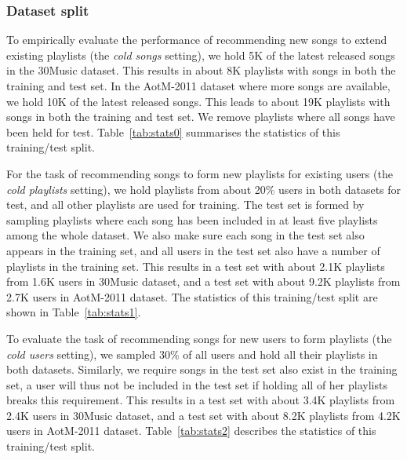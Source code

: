 \subsubsection{Dataset split}
To empirically evaluate the performance of recommending new songs to extend existing playlists (\ie the \emph{cold songs} setting),
we hold 5K of the latest released songs in the 30Music dataset. 
This results in about 8K playlists with songs in both the training and test set.
In the AotM-2011 dataset where more songs are available, we hold 10K of the latest released songs.
This leads to about 19K playlists with songs in both the training and test set.
We remove playlists where all songs have been held for test. %
Table~\ref{tab:stats0} summarises the statistics of this training/test split.

For the task of recommending songs to form new playlists for existing users (\ie the \emph{cold playlists} setting),
we hold playlists from about 20\% users in both datasets for test, and all other playlists are used for training.
The test set is formed by sampling playlists where each song has been included in at least five playlists among the whole dataset.
We also make sure each song in the test set also appears in the training set,
and all users in the test set also have a number of playlists in the training set.
This results in a test set with about 2.1K playlists from 1.6K users in 30Music dataset,
and a test set with about 9.2K playlists from 2.7K users in AotM-2011 dataset.
The statistics of this training/test split are shown in Table~\ref{tab:stats1}.

To evaluate the task of recommending songs for new users to form playlists (\ie the \emph{cold users} setting),
we sampled 30\% of all users and hold all their playlists in both datasets.
Similarly, we require songs in the test set also exist in the training set,
a user will thus not be included in the test set if holding all of her playlists breaks this requirement.
This results in a test set with about 3.4K playlists from 2.4K users in 30Music dataset,
and a test set with about 8.2K playlists from 4.2K users in AotM-2011 dataset.
Table~\ref{tab:stats2} describes the statistics of this training/test split.



%


